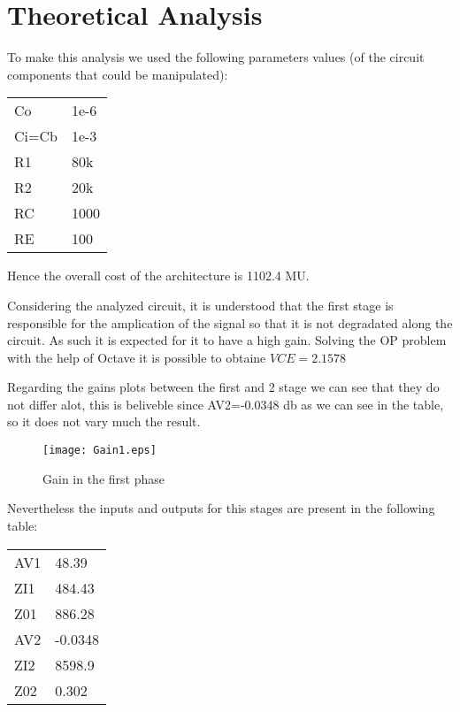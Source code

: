 \newpage
\section{Theoretical Analysis}
\label{sec:analysis}

To make this analysis we used the following parameters values (of the circuit components that could be manipulated):


\begin{table}[h]
\centering
\begin{tabular}{ll}

Co & 1e-6 \\
Ci=Cb & 1e-3 \\
R1 & 80k \\
R2 & 20k  \\
RC & 1000 \\
RE & 100 
\end{tabular}
\end{table}

Hence the overall cost of the architecture is 1102.4 MU.

Considering the analyzed circuit, it is understood that the first stage is responsible for the amplication of the signal so that it is not degradated along the circuit. As such it is expected for it to have a high gain. 
Solving the OP problem with the help of Octave it is possible to obtaine $VCE=2.1578$

Regarding the gains plots between the first and 2 stage we can see that they do not differ alot, this is beliveble since AV2=-0.0348 db as we can see in the table, so it does not vary much the result.


\begin{figure}[h]
\centering
\texttt{[image: Gain1.eps]}
\caption{Gain in the first phase}
\label{plot:ganho1}
\end{figure}

\newpage

Nevertheless the inputs and outputs for this stages are present in the following table:

\begin{table}[h]
\centering
\begin{tabular}{ll}

AV1 & 48.39 \\
ZI1 & 484.43 \\
Z01 & 886.28 \\
AV2 & -0.0348  \\
ZI2 & 8598.9 \\
Z02 & 0.302 
\end{tabular}
\end{table}

